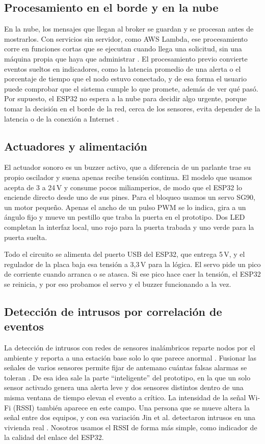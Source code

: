 \documentclass[manuscript,screen,nonacm]{acmart}
\begin{document}
\subsection{Procesamiento en el borde y en la nube}
En la nube, los mensajes que llegan al broker se guardan y se procesan antes de mostrarlos. Con servicios sin servidor, como AWS Lambda, ese procesamiento corre en funciones cortas que se ejecutan cuando llega una solicitud, sin una máquina propia que haya que administrar \cite{aws2026lambda}. El procesamiento previo convierte eventos sueltos en indicadores, como la latencia promedio de una alerta o el porcentaje de tiempo que el nodo estuvo conectado, y de esa forma el usuario puede comprobar que el sistema cumple lo que promete, además de ver qué pasó. Por supuesto, el ESP32 no espera a la nube para decidir algo urgente, porque tomar la decisión en el borde de la red, cerca de los sensores, evita depender de la latencia o de la conexión a Internet \cite{shi2016edge}.

\subsection{Actuadores y alimentación}
El actuador sonoro es un buzzer activo, que a diferencia de un parlante trae su propio oscilador y suena apenas recibe tensión continua. El modelo que usamos acepta de 3 a 24\,V y consume pocos miliamperios, de modo que el ESP32 lo enciende directo desde uno de sus pines. Para el bloqueo usamos un servo SG90, un motor pequeño. Apenas el ancho de un pulso PWM se lo indica, gira a un ángulo fijo y mueve un pestillo que traba la puerta en el prototipo. Dos LED completan la interfaz local, uno rojo para la puerta trabada y uno verde para la puerta suelta.

Todo el circuito se alimenta del puerto USB del ESP32, que entrega 5\,V, y el regulador de la placa baja esa tensión a 3,3\,V para la lógica. El servo pide un pico de corriente cuando arranca o se atasca. Si ese pico hace caer la tensión, el ESP32 se reinicia, y por eso probamos el servo y el buzzer funcionando a la vez.

\subsection{Detección de intrusos por correlación de eventos}
La detección de intrusos con redes de sensores inalámbricos reparte nodos por el ambiente y reporta a una estación base solo lo que parece anormal \cite{walchli2009building}. Fusionar las señales de varios sensores permite fijar de antemano cuántas falsas alarmas se toleran \cite{pugh2015fusion}. De esa idea sale la parte ``inteligente'' del prototipo, en la que un solo sensor activado genera una alerta leve y dos sensores distintos dentro de una misma ventana de tiempo elevan el evento a crítico. La intensidad de la señal Wi-Fi (RSSI) también aparece en este campo. Una persona que se mueve altera la señal entre dos equipos, y con esa variación Jin et al. detectaron intrusos en una vivienda real \cite{jin2018wlid}. Nosotros usamos el RSSI de forma más simple, como indicador de la calidad del enlace del ESP32.
\end{document}

